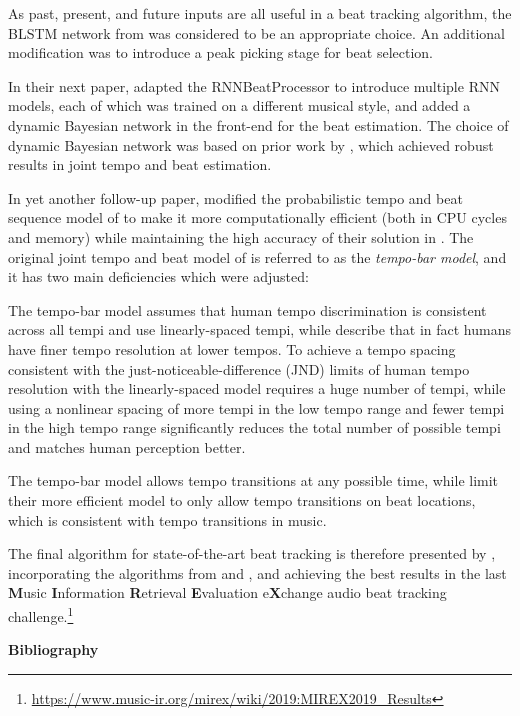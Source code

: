\documentclass[letter,11pt]{report}
\newenvironment{tight_enumerate}{
\begin{enumerate}
  \setlength{\itemsep}{0pt}
  \setlength{\parskip}{0pt}
}{\end{enumerate}}
\begin{document}
As past, present, and future inputs are all useful in a beat tracking algorithm, the BLSTM network from \textcite{rnnonset} was considered to be an appropriate choice. An additional modification was to introduce a peak picking stage for beat selection.

In their next paper, \textcite{bock3} adapted the RNNBeatProcessor to introduce multiple RNN models, each of which was trained on a different musical style, and added a dynamic Bayesian network in the front-end for the beat estimation. The choice of dynamic Bayesian network was based on prior work by \textcite{whiteley}, which achieved robust results in joint tempo and beat estimation.

In yet another follow-up paper, \textcite{bock2} modified the probabilistic tempo and beat sequence model of \cite{whiteley} to make it more computationally efficient (both in CPU cycles and memory) while maintaining the high accuracy of their solution in \cite{bock3}. The original joint tempo and beat model of \textcite{whiteley} is referred to as the \textit{tempo-bar model}, and it has two main deficiencies which were adjusted:

\begin{tight_enumerate}
	\vspace{-0.25em}
	\item
		The tempo-bar model assumes that human tempo discrimination is consistent across all tempi and use linearly-spaced tempi, while \textcite{bock2} describe that in fact humans have finer tempo resolution at lower tempos. To achieve a tempo spacing consistent with the just-noticeable-difference (JND) limits of human tempo resolution with the linearly-spaced model requires a huge number of tempi, while using a nonlinear spacing of more tempi in the low tempo range and fewer tempi in the high tempo range significantly reduces the total number of possible tempi and matches human perception better.
	\item
		The tempo-bar model allows tempo transitions at any possible time, while \textcite{bock2} limit their more efficient model to only allow tempo transitions on beat locations, which is consistent with tempo transitions in music.
\end{tight_enumerate}

The final algorithm for state-of-the-art beat tracking is therefore presented by \cite{bock2}, incorporating the algorithms from \cite{bock1} and \cite{bock3}, and achieving the best results in the last \textbf{M}usic \textbf{I}nformation \textbf{R}etrieval \textbf{E}valuation e\textbf{X}change audio beat tracking challenge.\footnote{\url{https://www.music-ir.org/mirex/wiki/2019:MIREX2019_Results}}

\vfill
\clearpage

\noindent\LARGE{\textbf{Bibliography}}\\

\vspace{-1em}

\nocite{*}
\printbibliography[heading=none]
\end{document}
